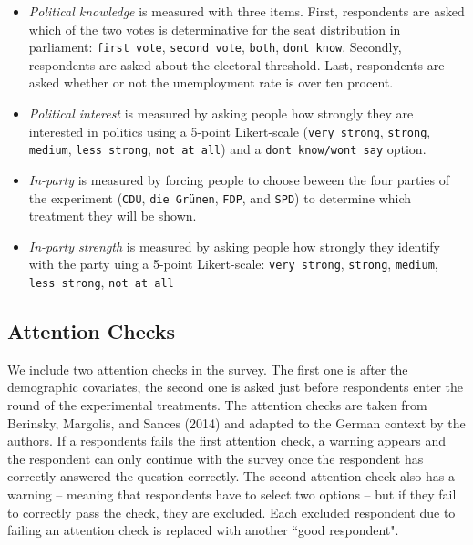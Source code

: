 \documentclass[]{article}
\begin{document}
\begin{itemize}
\item
  \emph{Political knowledge} is measured with three items. First,
  respondents are asked which of the two votes is determinative for the
  seat distribution in parliament: \texttt{first\ vote},
  \texttt{second\ vote}, \texttt{both},
  \texttt{don\textquotesingle{}t\ know}. Secondly, respondents are asked
  about the electoral threshold. Last, respondents are asked whether or
  not the unemployment rate is over ten procent.
\item
  \emph{Political interest} is measured by asking people how strongly
  they are interested in politics using a 5-point Likert-scale
  (\texttt{very\ strong}, \texttt{strong}, \texttt{medium},
  \texttt{less\ strong}, \texttt{not\ at\ all}) and a
  \texttt{don\textquotesingle{}t\ know/won\textquotesingle{}t\ say}
  option.
\item
  \emph{In-party} is measured by forcing people to choose beween the
  four parties of the experiment (\texttt{CDU}, \texttt{die\ Grünen},
  \texttt{FDP}, and \texttt{SPD}) to determine which treatment they will
  be shown.
\item
  \emph{In-party strength} is measured by asking people how strongly
  they identify with the party uing a 5-point Likert-scale:
  \texttt{very\ strong}, \texttt{strong}, \texttt{medium},
  \texttt{less\ strong}, \texttt{not\ at\ all}
\end{itemize}

\hypertarget{attention-checks}{%
\subsection{Attention Checks}\label{attention-checks}}

We include two attention checks in the survey. The first one is after
the demographic covariates, the second one is asked just before
respondents enter the round of the experimental treatments. The
attention checks are taken from Berinsky, Margolis, and Sances (2014)
and adapted to the German context by the authors. If a respondents fails
the first attention check, a warning appears and the respondent can only
continue with the survey once the respondent has correctly answered the
question correctly. The second attention check also has a warning --
meaning that respondents have to select two options -- but if they fail
to correctly pass the check, they are excluded. Each excluded respondent
due to failing an attention check is replaced with another ``good
respondent".
\end{document}
